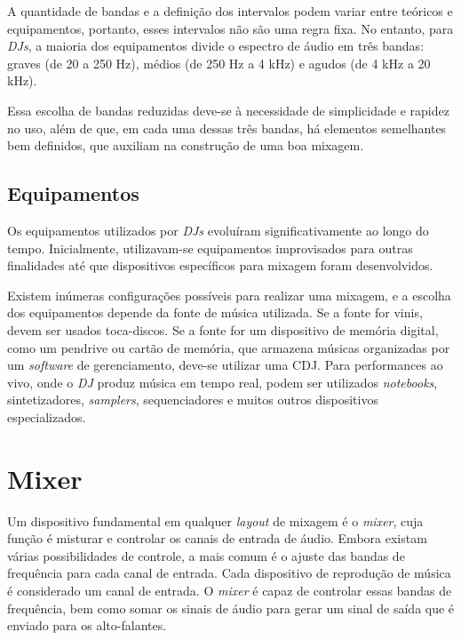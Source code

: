A quantidade de bandas e a definição dos intervalos podem variar entre teóricos e equipamentos, portanto, esses intervalos não são uma regra fixa. No entanto, para \textit{DJs}, a maioria dos equipamentos divide o espectro de áudio em três bandas: graves (de 20 a 250 Hz), médios (de 250 Hz a 4 kHz) e agudos (de 4 kHz a 20 kHz).

Essa escolha de bandas reduzidas deve-se à necessidade de simplicidade e rapidez no uso, além de que, em cada uma dessas três bandas, há elementos semelhantes bem definidos, que auxiliam na construção de uma boa mixagem.



\subsection{Equipamentos}

Os equipamentos utilizados por \textit{DJs} evoluíram significativamente ao longo do tempo. Inicialmente, utilizavam-se equipamentos improvisados para outras finalidades até que dispositivos específicos para mixagem foram desenvolvidos.

Existem inúmeras configurações possíveis para realizar uma mixagem, e a escolha dos equipamentos depende da fonte de música utilizada. Se a fonte for vinis, devem ser usados toca-discos. Se a fonte for um dispositivo de memória digital, como um pendrive ou cartão de memória, que armazena músicas organizadas por um \textit{software} de gerenciamento, deve-se utilizar uma CDJ. Para performances ao vivo, onde o \textit{DJ} produz música em tempo real, podem ser utilizados \textit{notebooks}, sintetizadores, \textit{samplers}, sequenciadores e muitos outros dispositivos especializados.

\section{Mixer}

Um dispositivo fundamental em qualquer \textit{layout} de mixagem é o \textit{mixer}, cuja função é misturar e controlar os canais de entrada de áudio. Embora existam várias possibilidades de controle, a mais comum é o ajuste das bandas de frequência para cada canal de entrada. Cada dispositivo de reprodução de música é considerado um canal de entrada. O \textit{mixer} é capaz de controlar essas bandas de frequência, bem como somar os sinais de áudio para gerar um sinal de saída que é enviado para os alto-falantes.


